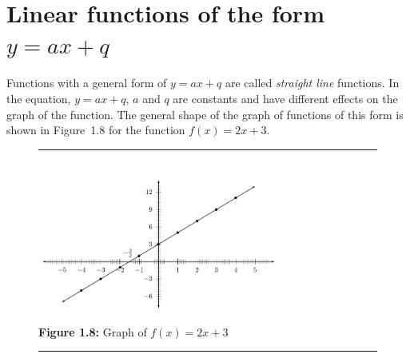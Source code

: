             \section{ Linear functions of the form $y=ax+q$}
            \nopagebreak
        \label{m39338*id237465}Functions with a general form of $y=ax+q$ are called \textsl{straight line} functions. In the equation, $y=ax+q$, $a$ and $q$ are constants and have different effects on the graph of the function. The general shape of the graph of functions of this form is shown in Figure~1.8 for the function $f\left(x\right)=2x+3$.\par 
    \setcounter{subfigure}{0}
	\begin{figure}[H] %
    \begin{center}
    \rule[.1in]{\figurerulewidth}{.005in} \\
        \label{m39338*uid69!!!underscore!!!media}\label{m39338*uid69!!!underscore!!!printimage}\includegraphics[width=300px]{col11306.imgs/m39338_MG10C11_005.png} %
      \vspace{2pt}
    \vspace{\rubberspace}\par \begin{cnxcaption}
	  \small \textbf{Figure 1.8: }Graph of $f\left(x\right)=2x+3$
	\end{cnxcaption}
    \vspace{.1in}
    \rule[.1in]{\figurerulewidth}{.005in} \\
    \end{center}
 \end{figure}       
\label{m39338*secfhsst!!!underscore!!!id833}
            \nopagebreak
